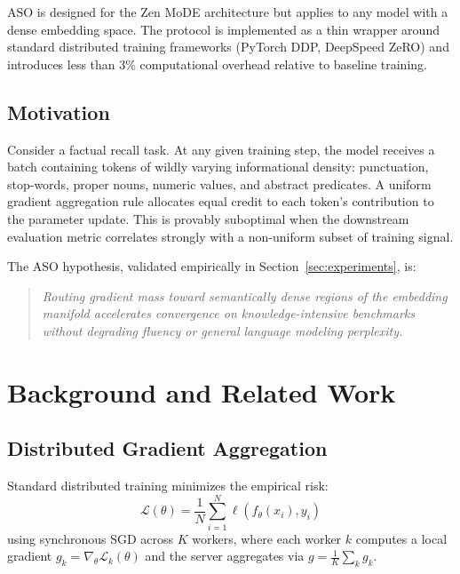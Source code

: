 \documentclass[11pt,a4paper]{article}
\begin{document}
ASO is designed for the Zen MoDE architecture \cite{zenlm2025mode} but applies to any
model with a dense embedding space. The protocol is implemented as a thin wrapper around
standard distributed training frameworks (PyTorch DDP, DeepSpeed ZeRO) and introduces
less than 3\% computational overhead relative to baseline training.

\subsection{Motivation}

Consider a factual recall task. At any given training step, the model receives a batch
containing tokens of wildly varying informational density: punctuation, stop-words,
proper nouns, numeric values, and abstract predicates. A uniform gradient aggregation
rule allocates equal credit to each token's contribution to the parameter update. This
is provably suboptimal when the downstream evaluation metric correlates strongly with
a non-uniform subset of training signal.

The ASO hypothesis, validated empirically in Section~\ref{sec:experiments}, is:

\begin{quote}
\emph{Routing gradient mass toward semantically dense regions of the embedding manifold
accelerates convergence on knowledge-intensive benchmarks without degrading fluency or
general language modeling perplexity.}
\end{quote}

\section{Background and Related Work}
\label{sec:background}

\subsection{Distributed Gradient Aggregation}

Standard distributed training minimizes the empirical risk:
\begin{equation}
    \mathcal{L}(\theta) = \frac{1}{N} \sum_{i=1}^{N} \ell(f_\theta(x_i), y_i)
    \label{eq:empirical_risk}
\end{equation}
using synchronous SGD across $K$ workers, where each worker $k$ computes a local gradient
$g_k = \nabla_\theta \mathcal{L}_k(\theta)$ and the server aggregates via
$g = \frac{1}{K}\sum_k g_k$.
\end{document}
